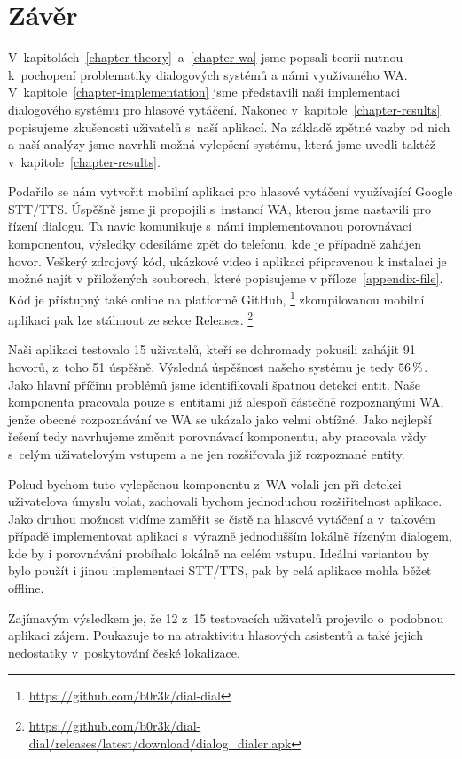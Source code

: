 \chapter*{Závěr}

V~kapitolách~\ref{chapter-theory}~a~\ref{chapter-wa} jsme popsali teorii nutnou
k~pochopení problematiky dialogových systémů a námi využívaného WA.
V~kapitole~\ref{chapter-implementation} jsme představili naši
implementaci dialogového systému pro hlasové vytáčení.
Nakonec v~kapitole~\ref{chapter-results} popisujeme zkušenosti
uživatelů s~naší aplikací. Na základě zpětné vazby od nich a naší analýzy jsme navrhli možná
vylepšení systému, která jsme uvedli taktéž v~kapitole~\ref{chapter-results}.

Podařilo se nám vytvořit mobilní aplikaci pro hlasové vytáčení využívající
Google STT/TTS. Úspěšně jsme ji propojili
s~instancí WA, kterou jsme nastavili pro řízení dialogu. Ta navíc komunikuje s~námi
implementovanou porovnávací komponentou, výsledky odesíláme zpět do telefonu,
kde je případně zahájen hovor. Veškerý zdrojový kód, ukázkové video i aplikaci
připravenou k instalaci
je možné najít v přiložených souborech, které popisujeme v příloze~\ref{appendix-file}.
Kód je přístupný také online na platformě GitHub,%
\footnote{\url{https://github.com/b0r3k/dial-dial}}
zkompilovanou mobilní aplikaci pak lze stáhnout ze sekce Releases.%
\footnote{\url{https://github.com/b0r3k/dial-dial/releases/latest/download/dialog_dialer.apk}}

Naši aplikaci testovalo 15 uživatelů, kteří se dohromady pokusili zahájit 91 hovorů,
z~toho 51 úspěšně. Výsledná úspěšnost našeho systému je tedy \(56\,\rm \%\).
Jako hlavní příčinu problémů jsme identifikovali špatnou detekci entit.
Naše komponenta pracovala pouze s~entitami již alespoň částečně rozpoznanými
WA, jenže obecné rozpoznávání ve WA se ukázalo jako velmi obtížné. Jako nejlepší
řešení tedy navrhujeme změnit porovnávací komponentu, aby pracovala vždy s~celým
uživatelovým vstupem a ne jen rozšiřovala již rozpoznané entity.

Pokud bychom tuto vylepšenou komponentu z~WA volali jen při detekci uživatelova
úmyslu volat, zachovali bychom jednoduchou rozšiřitelnost aplikace. Jako
druhou možnost vidíme zaměřit se čistě na hlasové vytáčení a v~takovém
případě implementovat aplikaci s~výrazně jednodušším lokálně řízeným
dialogem, kde by i porovnávání probíhalo lokálně na celém vstupu. Ideální
variantou by bylo použít i jinou implementaci STT/TTS, pak by
celá aplikace mohla běžet offline.

Zajímavým výsledkem je, že 12 z~15 testovacích uživatelů projevilo o~podobnou
aplikaci zájem. Poukazuje to na atraktivitu hlasových asistentů
a také jejich nedostatky v~poskytování české lokalizace.